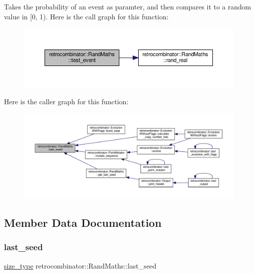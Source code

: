 Takes the probability of an event as paramter, and then compares it to a random value in \mbox{[}0, 1). Here is the call graph for this function\+:
\nopagebreak
\begin{figure}[H]
\begin{center}
\leavevmode
\includegraphics[width=350pt]{classretrocombinator_1_1RandMaths_a183686140a9da18ad40c7e048ee8914e_cgraph}
\end{center}
\end{figure}
Here is the caller graph for this function\+:
\nopagebreak
\begin{figure}[H]
\begin{center}
\leavevmode
\includegraphics[width=350pt]{classretrocombinator_1_1RandMaths_a183686140a9da18ad40c7e048ee8914e_icgraph}
\end{center}
\end{figure}


\subsection{Member Data Documentation}
\mbox{\label{classretrocombinator_1_1RandMaths_ab5b6bec8e0eaea80efe565cddc8e69ac}} 
\subsubsection{\texorpdfstring{last\+\_\+seed}{last\_seed}}
{\footnotesize\ttfamily \hyperlink{constants_8h_a8e1541b50cee66a791df4c437ccbb385}{size\+\_\+type} retrocombinator\+::\+Rand\+Maths\+::last\+\_\+seed\hspace{0.3cm}{\ttfamily [private]}}



